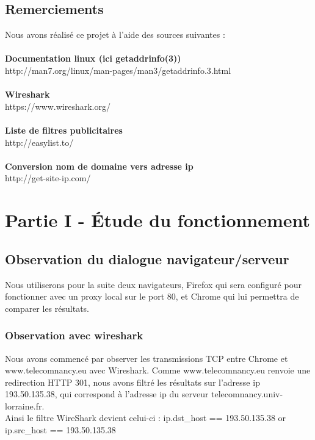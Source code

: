 \documentclass{scrreprt}
\begin{document}
\section{Remerciements}
Nous avons réalisé ce projet à l'aide des sources suivantes :\\\\
\textbf{Documentation linux (ici getaddrinfo(3))}\\
http://man7.org/linux/man-pages/man3/getaddrinfo.3.html\\
\\
\textbf{Wireshark}\\
https://www.wireshark.org/\\
\\
\textbf{Liste de filtres publicitaires}\\
http://easylist.to/\\
\\
\textbf{Conversion nom de domaine vers adresse ip}\\
http://get-site-ip.com/\\

\chapter{Partie I - Étude du fonctionnement}

\section{Observation du dialogue navigateur/serveur}

Nous utiliserons pour la suite deux navigateurs, Firefox qui sera configuré pour fonctionner avec un proxy local sur le port 80, et Chrome qui lui permettra de comparer les résultats.

\subsection{Observation avec wireshark}

Nous avons commencé par observer les transmissions TCP entre Chrome et www.telecomnancy.eu avec Wireshark. Comme www.telecomnancy.eu renvoie une redirection HTTP 301, nous avons filtré les résultats sur l'adresse ip 193.50.135.38, qui correspond à l'adresse ip du serveur telecomnancy.univ-lorraine.fr.
\\
Ainsi le filtre WireShark devient celui-ci :
ip.dst_host == 193.50.135.38 or ip.src_host == 193.50.135.38
\end{document}
